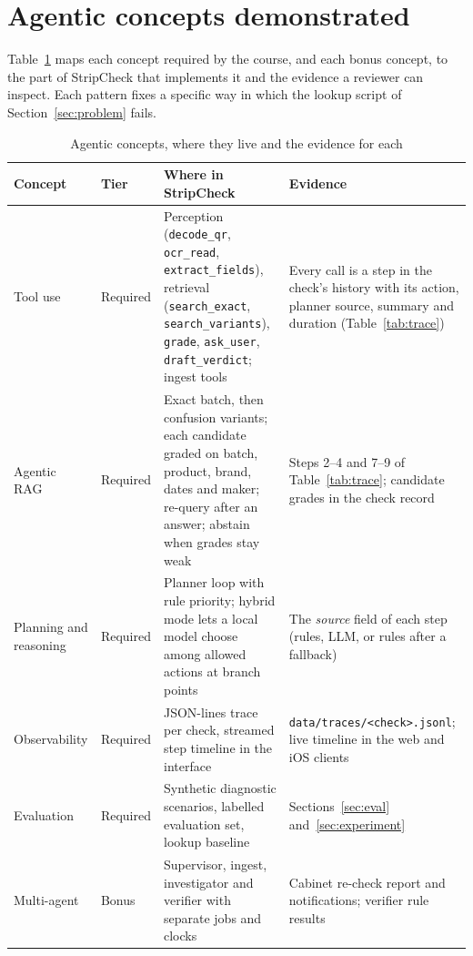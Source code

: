 \section{Agentic concepts demonstrated}
\label{sec:concepts}

Table~\ref{tab:concepts} maps each concept required by the course, and each bonus concept, to the part of StripCheck that implements it and the evidence a reviewer can inspect. Each pattern fixes a specific way in which the lookup script of Section~\ref{sec:problem} fails.

\begin{table}[t]
\centering
\caption{Agentic concepts, where they live and the evidence for each}
\label{tab:concepts}
\scriptsize
\begin{tabularx}{\textwidth}{@{}>{\raggedright\arraybackslash}p{24mm} >{\raggedright\arraybackslash}p{9mm} X X@{}}
\toprule
Concept & Tier & Where in StripCheck & Evidence \\
\midrule
Tool use & Required & Perception (\texttt{decode\_qr}, \texttt{ocr\_read}, \texttt{extract\_fields}), retrieval (\texttt{search\_exact}, \texttt{search\_variants}), \texttt{grade}, \texttt{ask\_user}, \texttt{draft\_verdict}; ingest tools & Every call is a step in the check's history with its action, planner source, summary and duration (Table~\ref{tab:trace}) \\
Agentic RAG & Required & Exact batch, then confusion variants; each candidate graded on batch, product, brand, dates and maker; re-query after an answer; abstain when grades stay weak & Steps 2--4 and 7--9 of Table~\ref{tab:trace}; candidate grades in the check record \\
Planning and reasoning & Required & Planner loop with rule priority; hybrid mode lets a local model choose among allowed actions at branch points & The \emph{source} field of each step (rules, LLM, or rules after a fallback) \\
Observability & Required & JSON-lines trace per check, streamed step timeline in the interface & \texttt{data/traces/<check>.jsonl}; live timeline in the web and iOS clients \\
Evaluation & Required & Synthetic diagnostic scenarios, labelled evaluation set, lookup baseline & Sections~\ref{sec:eval} and~\ref{sec:experiment} \\
Multi-agent & Bonus & Supervisor, ingest, investigator and verifier with separate jobs and clocks & Cabinet re-check report and notifications; verifier rule results \\

\end{tabularx}
\end{table}
